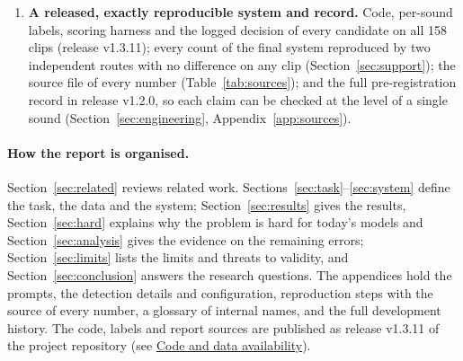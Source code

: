 \begin{enumerate}
        reported over a range of weights (Sections~\ref{sec:task}, \ref{sec:sensitivity} and~\ref{sec:analysis});
        model-written references and model judges were tried and fail at the visibility question
        (Section~\ref{sec:hard-measure}).
  \item \textbf{A released, exactly reproducible system and record.} Code, per-sound labels, scoring harness and the
        logged decision of every candidate on all 158 clips (release v1.3.11); every count of the final system reproduced by two
        independent routes with no difference on any clip (Section~\ref{sec:support}); the source file of every number
        (Table~\ref{tab:sources}); and the full pre-registration record in release v1.2.0, so each claim can be checked at
        the level of a single sound (Section~\ref{sec:engineering}, Appendix~\ref{app:sources}).
\end{enumerate}

\paragraph{How the report is organised.} Section~\ref{sec:related} reviews related work.
Sections~\ref{sec:task}--\ref{sec:system} define the task, the data and the system; Section~\ref{sec:results} gives the
results, Section~\ref{sec:hard} explains why the problem is hard for today's models and Section~\ref{sec:analysis}
gives the evidence on the remaining errors; Section~\ref{sec:limits} lists the limits and threats to validity, and Section~\ref{sec:conclusion} answers the research questions. The
appendices hold the prompts, the detection details and configuration, reproduction steps with the source of every
number, a glossary of internal names, and the full development history. The code, labels and report sources are
published as release v1.3.11 of the project repository (see
\hyperref[sec:availability]{Code and data availability}).
